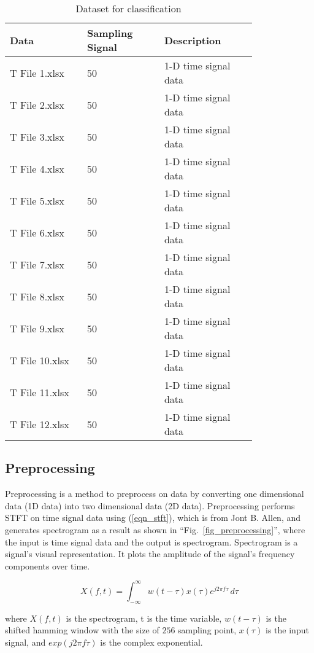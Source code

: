 \documentclass[conference]{IEEEtran}
\begin{document}
\begin{table}[!htbp]
\centering
\caption{Dataset for classification}
\begin{tabularx}{0.48\textwidth}{p{0.25\linewidth} | p{0.25\linewidth} | p{0.3\linewidth}}
\hline
Data    & Sampling Signal & Description\\
\hline
T File 1.xlsx  &50 & 1-D time signal data\\
T File 2.xlsx  &50 & 1-D time signal data\\
T File 3.xlsx  &50 & 1-D time signal data\\
T File 4.xlsx  &50 & 1-D time signal data\\
T File 5.xlsx  &50 & 1-D time signal data\\
T File 6.xlsx  &50 & 1-D time signal data\\
T File 7.xlsx  &50 & 1-D time signal data\\
T File 8.xlsx  &50 & 1-D time signal data\\
T File 9.xlsx  &50 & 1-D time signal data\\
T File 10.xlsx  &50 & 1-D time signal data\\
T File 11.xlsx  &50 & 1-D time signal data\\
T File 12.xlsx  &50 & 1-D time signal data\\
\hline
\end{tabularx}
\label{table_classifydata}
\end{table}

\subsection{Preprocessing}
Preprocessing is a method to preprocess on data by converting one dimensional data (1D data) into two dimensional data (2D data). Preprocessing performs STFT on time signal data using (\ref{eqn_stft}), which is from Jont B. Allen\cite{b3}, and generates spectrogram as a result as shown in ``Fig.~\ref{fig_preprocessing}'', where the input is time signal data and the output is spectrogram. Spectrogram is a signal's visual representation. It plots the amplitude of the signal's frequency components over time. 

\begin{equation}
X(f,t) = \int_{-\infty}^{\infty} w(t-\tau)x(\tau)e^{j2\pi f\tau} \,d\tau \label{eqn_stft}
\end{equation}

where \(X(f, t) \) is the spectrogram, t is the time variable, \(w(t - \tau)\) is the shifted hamming window with the size of \(256\) sampling point, \(x(\tau)\) is the input
signal, and \(exp (j2\pi f\tau)\) is the complex exponential.
\end{document}
